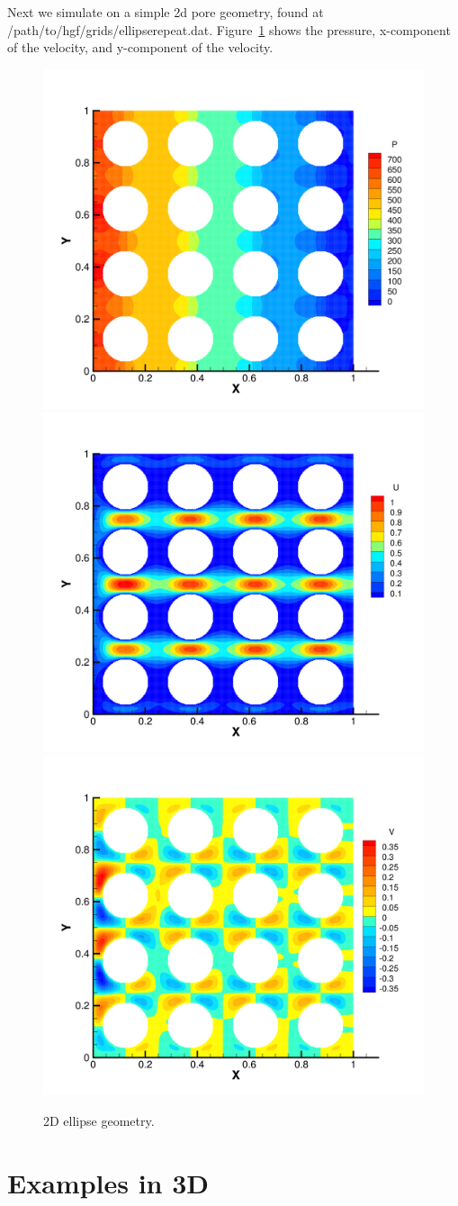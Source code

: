 \documentclass{report}
\begin{document}
\noindent Next we simulate on a simple 2d pore geometry, found at /path/to/hgf/grids/ellipserepeat.dat.
Figure~\ref{fig:2dellipse} shows the pressure, x-component of the velocity, and
y-component of the velocity.
\begin{figure}
  \centering
  \includegraphics[width=.49\textwidth]{images/ellipseRepeat2dP.png}
  \includegraphics[width=.49\textwidth]{images/ellipseRepeat2dU.png}\\
  \includegraphics[width=.5\textwidth]{images/ellipseRepeat2dV.png}
  \caption{\label{fig:2dellipse}2D ellipse geometry.}
\end{figure}

\section{Examples in 3D}
\end{document}
